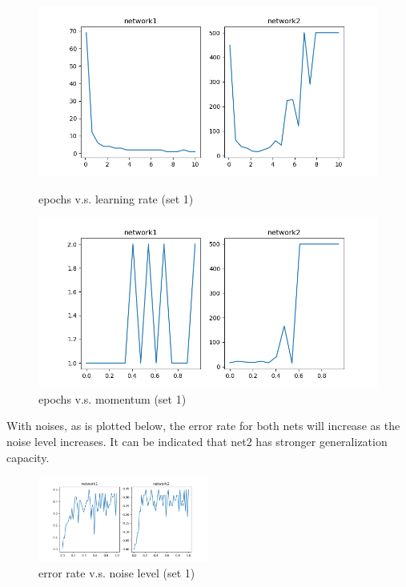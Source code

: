 \documentclass{article}
\begin{document}
\begin{figure}[!ht]
    \begin{minipage}{0.5\textwidth}
        \centering
        \includegraphics[width=\linewidth]{part1set1.png} 
        \caption{epochs v.s. learning rate (set 1)}   
    \end{minipage}\hfill
    \begin{minipage}{0.5\textwidth}
        \centering
        \includegraphics[width=\linewidth]{part1set1m.png}    
        \caption{epochs v.s. momentum (set 1)}
    \end{minipage}
\end{figure}

With noises, as is plotted below, the error rate for both nets will increase as the noise level increases. It can be indicated that net2 has stronger generalization capacity.
\begin{figure}[!ht]
    \centering
    \includegraphics[width=0.5\textwidth]{part1set1g.png}
    \caption{error rate v.s. noise level (set 1)}
\end{figure}
\end{document}
